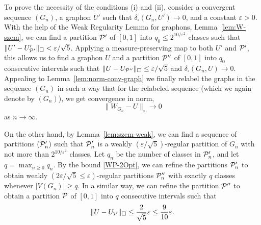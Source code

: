 \documentclass[12pt]{article}
\numberwithin{equation}{section}
\def\eps{\varepsilon}
\def\PP{{\cal P}}\def\QQ{{\cal Q}}\def\RR{{\cal R}}
\begin{document}
To prove the necessity of the conditions (i) and (ii), consider a
convergent sequence $(G_n)$, a graphon $U'$ such that
$\delta_\square(G_n,U')\to 0$, and a constant $\eps>0$.  With the
help of the Weak Regularity Lemma for graphons,
Lemma~\ref{lem:W-szem}, we can find a partition $\PP'$ of $[0,1]$
into $q_0\leq 2^{10/\eps^2}$ classes such that
$\|U'-U'_{\PP'}\|_\square<  \eps/\sqrt 5$. Applying a
measure-preserving map to both $U'$ and $\PP'$, this allows us to
find a graphon $U$ and a partition $\PP''$ of $[0,1]$ into $q_0$
consecutive intervals such that $\|U-U_{\PP''}\|_\square\leq
\eps/\sqrt 5 $ and $\delta_\square(G_n,U)\to 0$.  Appealing to
Lemma~\ref{lem:norm-conv-graph} we finally relabel the graphs in the
sequence $(G_n)$ in such a way that for the relabeled sequence (which
we again denote by $(G_n)$), we get convergence in norm,
\[\|W_{G_n}-U\|_\square\to 0
\]
as $n\to\infty$.



On the other hand, by {Lemma~\ref{lem:szem-weak}}, we can find a
sequence of partitions $(\PP'_n)$ such that $\PP'_n$ is a weakly
$(\eps/\sqrt 5)$-regular partition of $G_n$ with not more than
$2^{10/\eps^2}$ classes. Let $q_n$ be the number of classes in
$\PP'_n$, and let $q=\max_{n\ge 0} q_n$. By the bound
\eqref{WP-2Opt}, we can refine the partitions $\PP'_n$ to obtain
weakly $(2\eps/\sqrt 5\leq\eps)$-regular partitions $\PP_n''$ with
exactly $q$ classes whenever $|V(G_n)|\geq q$.  In a similar
way, we can refine the partition $\PP''$ to obtain a partition $\PP$
of $[0,1]$ into $q$ consecutive intervals such that
\[
\|U-U_{\PP}\|_\square\leq \frac 2{\sqrt 5}\eps\leq \frac {9}{10}\eps.
\]
\end{document}

